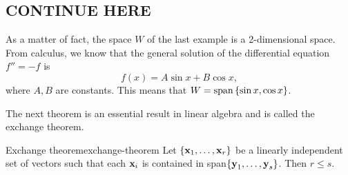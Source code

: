 \subsection{CONTINUE HERE}

\begin{example}{}{}
  As a matter of fact, the space $W$ of the last example is a
  2-dimensional space. From calculus, we know that the general solution
  of the differential equation $f''=-f$ is
  \begin{equation*}
    f(x) = A\sin x + B\cos x,
  \end{equation*}
  where $A,B$ are constants. This means that $W=\sspan\set{\sin x, \cos x}$.
\end{example}


The next theorem is an essential result in linear algebra and is
called the exchange theorem.

\begin{theorem}{Exchange theorem}{exchange-theorem}
  Let $\left\{\mbox{\bf x}_{1},\ldots,\mbox{\bf x}_{r}\right\} $ be a linearly
  independent set of vectors such that each $\mbox{\bf x}_{i}$ is
  contained in span$\left\{\mbox{\bf y}_{1},\ldots,\mbox{\bf y}_{s}\right\}$. Then
  $ r\leq s$.
\end{theorem}

